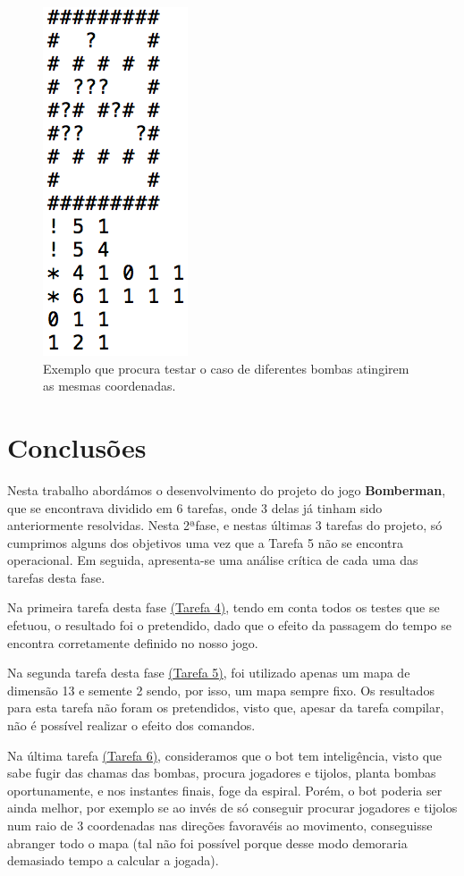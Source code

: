 \documentclass[a4paper]{article}
\begin{document}
\begin{figure}[H]
\centering 
\includegraphics[scale=0.40]{exemplo38}
\caption{{\small Exemplo que procura testar o caso de diferentes bombas atingirem as mesmas
coordenadas.}}
\end{figure}

\section{Conclusões}
\label{sec:conclusao}

Nesta trabalho abordámos o desenvolvimento do projeto do jogo \textbf{Bomberman},
que se encontrava dividido em 6 tarefas, onde 3 delas já tinham sido 
anteriormente resolvidas. Nesta 2ªfase, e nestas últimas 3 tarefas do projeto, 
só cumprimos alguns dos objetivos uma vez que a Tarefa 5 não se encontra operacional. 
Em seguida, apresenta-se uma análise crítica de cada uma das tarefas desta fase.

Na primeira tarefa desta fase \underline{(Tarefa 4)}, tendo em conta todos os testes 
que se efetuou, o resultado foi o pretendido, dado que o efeito da passagem do tempo se
encontra corretamente definido no nosso jogo.

Na segunda tarefa desta fase \underline{(Tarefa 5)}, foi utilizado apenas um mapa de dimensão 
13 e semente 2 sendo, por isso, um mapa sempre fixo. Os resultados para esta tarefa não foram os 
pretendidos, visto que, apesar da tarefa compilar, não é possível realizar o efeito dos comandos. 

Na última tarefa \underline{(Tarefa 6)}, consideramos que o bot tem inteligência,
visto que sabe fugir das chamas das bombas, procura jogadores e tijolos, 
planta bombas oportunamente, e nos instantes finais, foge da espiral. Porém, o bot
poderia ser ainda melhor, por exemplo se ao invés de só conseguir procurar jogadores
e tijolos num raio de 3 coordenadas nas direções favoravéis ao movimento, conseguisse 
abranger todo o mapa (tal não foi possível porque desse modo demoraria demasiado tempo a calcular a jogada).
\end{document}
